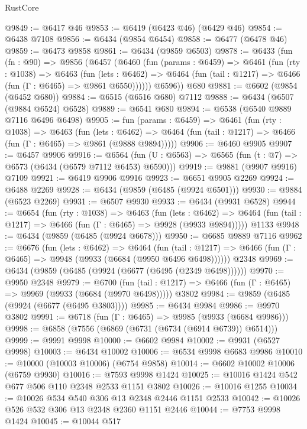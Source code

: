 \begin{lexlean}{RustCore}
\begin{coremodule}
@9849 := @6417 @46
@9853 := @6419 (@6423 @46) (@6429 @46)
@9854 := @6438 @7108
@9856 := @6434 (@9854 @6454)
@9858 := @6477 (@6478 @46)
@9859 := @6473 @9858
@9861 := @6434 (@9859 @6503)
@9878 := @6433
    (fun (fn : @90) =>
    @9856
      (@6457
        (@6460
          (fun (params : @6459) =>
          @6461
            (fun (rty : @1038) =>
            @6463
              (fun (lets : @6462) =>
              @6464 (fun (tail : @1217) => @6466 (fun (Γ : @6465) => @9861 @6550))))))
        @6596))
    @680
@9881 := @6602 (@9854 (@6452 @680))
@9884 := @6515 (@6516 @680) @7112
@9888 := @6434 (@6507 (@9884 @6524) @6528)
@9889 := @6541 @680
@9894 := @6538 (@6540 @9889 @7116 @6496 @6498)
@9905 := fun (params : @6459) =>
  @6461
    (fun (rty : @1038) =>
    @6463
      (fun (lets : @6462) =>
      @6464 (fun (tail : @1217) => @6466 (fun (Γ : @6465) => @9861 (@9888 @9894)))))
@9906 := @6460 @9905
@9907 := @6457 @9906
@9916 := @6564 (fun (U : @6563) => @6565 (fun (t : @7) => @6573 (@6434 (@6579 @7112 @6453) @6590)))
@9919 := @9881 (@9907 @9916) @7109
@9921 := @6419 @9906 @9916
@9923 := @6651 @9905 @2269
@9924 := @6488 @2269
@9928 := @6434 (@9859 (@6485 (@9924 @6501)))
@9930 := @9884 (@6523 @2269)
@9931 := @6507 @9930
@9933 := @6434 (@9931 @6528)
@9944 := @6654
    (fun (rty : @1038) =>
    @6463
      (fun (lets : @6462) =>
      @6464 (fun (tail : @1217) => @6466 (fun (Γ : @6465) => @9928 (@9933 @9894)))))
    @1133
@9948 := @6434 (@9859 (@6485 (@9924 @6678)))
@9950 := @6685 @9889 @7116
@9962 := @6676
    (fun (lets : @6462) =>
    @6464
      (fun (tail : @1217) => @6466 (fun (Γ : @6465) => @9948 (@9933 (@6684 (@9950 @6496 @6498))))))
    @2348
@9969 := @6434 (@9859 (@6485 (@9924 (@6677 (@6495 (@2349 @6498))))))
@9970 := @9950 @2348
@9979 := @6700
    (fun (tail : @1217) => @6466 (fun (Γ : @6465) => @9969 (@9933 (@6684 (@9970 @6498)))))
    @3802
@9984 := @9859 (@6485 (@9924 (@6677 (@6495 @3803))))
@9985 := @6434 @9984
@9986 := @9970 @3802
@9991 := @6718 (fun (Γ : @6465) => @9985 (@9933 (@6684 @9986)))
@9998 := @6858 (@7556 (@6869 (@6731 (@6734 (@6914 @6739)) @6514)))
@9999 := @9991 @9998
@10000 := @6602 @9984
@10002 := @9931 (@6527 @9998)
@10003 := @6434 @10002
@10006 := @6534 @9998 @6683 @9986
@10010 := @10000 (@10003 @10006) (@6754 @9858)
@10014 := @6602 @10002 @10006 (@6759 @9930)
@10016 := @7593 @9998 @1424
@10025 := @10016 @1424 @542 @677 @506 @110 @2348 @2533 @1151 @3802
@10026 := @10016 @1255
@10034 := @10026 @534 @540 @306 @13 @2348 @2446 @1151 @2533
@10042 := @10026 @526 @532 @306 @13 @2348 @2360 @1151 @2446
@10044 := @7753 @9998 @1424
@10045 := @10044 @517

\end{coremodule}
\end{lexlean}
